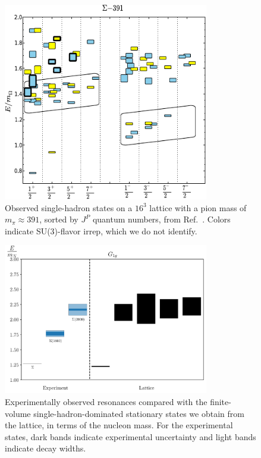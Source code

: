 \begin{figure}[H]
    \centering
    \hspace*{-1cm}\includegraphics[width=0.8\textwidth]{figures/edwards.pdf}
    \caption[Observed single-hadron states on a $16^3$ lattice with a pion mass of $m_\pi \approx 391$, sorted by $J^P$ quantum numbers.]{Observed single-hadron states on a $16^3$ lattice with a pion mass of $m_\pi \approx 391$, sorted by $J^P$ quantum numbers, from Ref.~\cite{Edwards:2012fx}. Colors indicate SU(3)-flavor irrep, which we do not identify.}\label{fig:edwards}
\end{figure}

\begin{figure}[H]
    \centering
    \includegraphics[width=0.8\textwidth]{figures/sigmas/g1g/expvslat.pdf}
    \caption[Experimentally observed resonances compared with the finite-volume single-hadron-dominated stationary states we obtain from the lattice in $G_{1g}$, in terms of the nucleon mass.]{Experimentally observed resonances compared with the finite-volume single-hadron-dominated stationary states we obtain from the lattice, in terms of the nucleon mass. For the experimental states, dark bands indicate experimental uncertainty and light bands indicate decay widths.}\label{fig:g1g_exp}
\end{figure}

